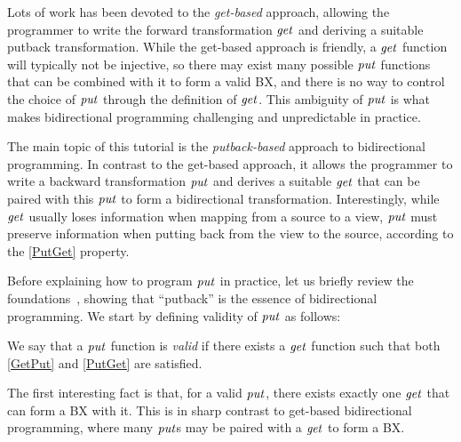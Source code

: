 Lots of work \cite{Lenses,Bohannon:06,Bohannon:08,Hofmann:2011,XLHZ07,MHNHT07,Voigt09,Hidaka:10} has been devoted to the {\em get-based}
approach, allowing the programmer to write the forward
transformation \ensuremath{\Varid{get}} and deriving a suitable putback transformation.
While the get-based approach is friendly, 
a \ensuremath{\Varid{get}} function will typically not be injective, so there may exist
many possible \ensuremath{\Varid{put}} functions that can be combined with it to form a
valid BX, and there is no way to control the choice of \ensuremath{\Varid{put}} through
the definition of \ensuremath{\Varid{get}}. 
This ambiguity of \ensuremath{\Varid{put}} is what makes bidirectional
programming challenging and unpredictable in practice.


The main topic of this tutorial is the {\em putback-based} approach
to bidirectional programming.
In contrast to the get-based approach, it allows the programmer to write a backward 
transformation \ensuremath{\Varid{put}} and derives a suitable \ensuremath{\Varid{get}} that can be
paired with this \ensuremath{\Varid{put}} to form a bidirectional transformation.
Interestingly, while \ensuremath{\Varid{get}} usually loses information
when mapping from a source to a view, \ensuremath{\Varid{put}} must preserve information
when putting back from the view to the source, according to the
\ref{PutGet} property.

Before explaining how to program \ensuremath{\Varid{put}} in practice, let us briefly review
the foundations~\cite{Foster:09,FiHP15,FiHP15b}, showing that ``putback''
is the essence of bidirectional programming.
We start by defining validity of \ensuremath{\Varid{put}} as follows:

\begin{definition}
We say that a \ensuremath{\Varid{put}} function is {\em valid} if there exists a \ensuremath{\Varid{get}} function
such that both \ref{GetPut} and \ref{PutGet} are satisfied. 
\end{definition}

The first interesting fact is that, for a valid \ensuremath{\Varid{put}}, there exists exactly one \ensuremath{\Varid{get}}
that can form a BX with it. This is in sharp contrast to get-based 
bidirectional programming, where many \ensuremath{\Varid{put}}s may be paired with a \ensuremath{\Varid{get}}
to form a BX. 

